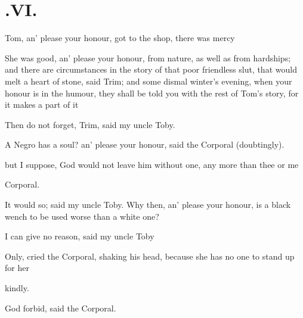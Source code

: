 \documentclass{article}
\begin{document}
\vfill{}\eject
\null{}\baselineskip
\section{.\enspace VI.}

 Tom, an’ please
your ho\-nour, got to the shop, there was\break
{}
mercy\tsh

\tsh She was good, an’ please your honour, from
nature, as well as from hardships; and there are circumstances in
the story of that poor friendless slut, that would melt a heart of
stone, said Trim; and some dismal winter’s evening,
when your honour is in the humour, they\etp{} shall be told you with the
rest of Tom’s story, for it makes a part of
it\tsh

Then do not forget, Trim, said my uncle Toby.

A Negro has a soul? an’ please your honour, said the
Corporal (doubtingly).

\noindent
{}
but I suppose, God would not leave him without
one, any more than thee or me\tsh

\noindent
{}
Corporal.

It would so; said my uncle Toby.\break
Why then, an’ please your honour, is a\break
black wench to be used worse than a\break
white one?

I can give no reason, said my uncle
Toby\tsh

\tsh Only, cried the Corporal, shaking his head,
because she has no one to stand up for her\tsh

\noindent
{}
kindly.

\tsh God forbid, said the Corporal.
\end{document}
